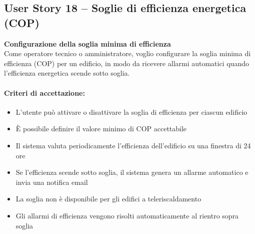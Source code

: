 \subsection{User Story 18 – Soglie di efficienza energetica (COP)}
\label{us:efficienzaCop}

\textbf{Configurazione della soglia minima di efficienza} \\
Come operatore tecnico o amministratore, voglio configurare la soglia minima di efficienza (COP) per un edificio, in modo da ricevere allarmi automatici quando l'efficienza energetica scende sotto soglia.

\paragraph*{Criteri di accettazione:}
\begin{itemize}
    \item L'utente può attivare o disattivare la soglia di efficienza per ciascun edificio
    \item È possibile definire il valore minimo di COP accettabile
    \item Il sistema valuta periodicamente l'efficienza dell'edificio su una finestra di 24 ore
    \item Se l'efficienza scende sotto soglia, il sistema genera un allarme automatico e invia una notifica email
    \item La soglia non è disponibile per gli edifici a teleriscaldamento
    \item Gli allarmi di efficienza vengono risolti automaticamente al rientro sopra soglia
\end{itemize}

